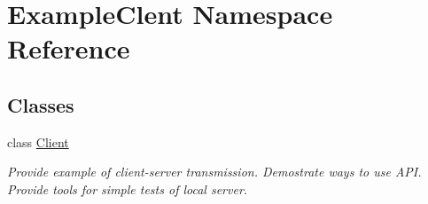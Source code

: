 \hypertarget{namespace_example_clent}{}\section{Example\+Clent Namespace Reference}
\label{namespace_example_clent}
\subsection*{Classes}
\begin{DoxyCompactItemize}
\item 
class \mbox{\hyperlink{class_example_clent_1_1_client}{Client}}
\begin{DoxyCompactList}\small\item\em Provide example of client-\/server transmission. Demostrate ways to use A\+PI. Provide tools for simple tests of local server. \end{DoxyCompactList}\end{DoxyCompactItemize}
